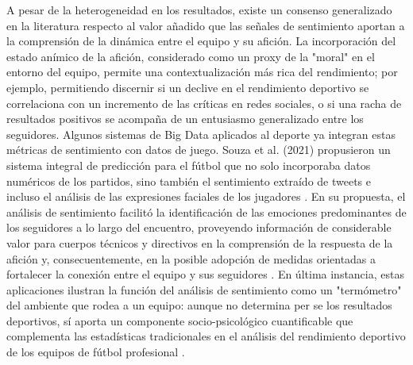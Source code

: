 A pesar de la heterogeneidad en los resultados, existe un consenso generalizado en la literatura respecto al valor añadido que las señales de sentimiento aportan a la comprensión de la dinámica entre el equipo y su afición. La incorporación del estado anímico de la afición, considerado como un proxy de la "moral" en el entorno del equipo, permite una contextualización más rica del rendimiento; por ejemplo, permitiendo discernir si un declive en el rendimiento deportivo se correlaciona con un incremento de las críticas en redes sociales, o si una racha de resultados positivos se acompaña de un entusiasmo generalizado entre los seguidores. Algunos sistemas de Big Data aplicados al deporte ya integran estas métricas de sentimiento con datos de juego. Souza et al. (2021) propusieron un sistema integral de predicción para el fútbol que no solo incorporaba datos numéricos de los partidos, sino también el sentimiento extraído de tweets e incluso el análisis de las expresiones faciales de los jugadores \cite{Selak2024}. En su propuesta, el análisis de sentimiento facilitó la identificación de las emociones predominantes de los seguidores a lo largo del encuentro, proveyendo información de considerable valor para cuerpos técnicos y directivos en la comprensión de la respuesta de la afición y, consecuentemente, en la posible adopción de medidas orientadas a fortalecer la conexión entre el equipo y sus seguidores \cite{Selak2024}. En última instancia, estas aplicaciones ilustran la función del análisis de sentimiento como un "termómetro" del ambiente que rodea a un equipo: aunque no determina per se los resultados deportivos, sí aporta un componente socio-psicológico cuantificable que complementa las estadísticas tradicionales en el análisis del rendimiento deportivo de los equipos de fútbol profesional \cite{Selak2024}.
